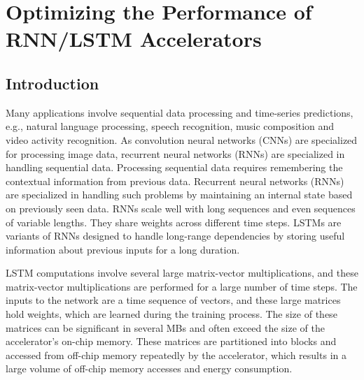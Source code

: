\graphicspath{{./Ch4-RNN/images/}}

\chapter{Optimizing the Performance of RNN/LSTM Accelerators} \label{chap:RNN}
\section{Introduction}
Many applications involve sequential data processing and time-series predictions, e.g., natural language processing, speech recognition, music composition and video activity recognition. As convolution neural networks (CNNs) are specialized for processing image data, recurrent neural networks (RNNs) are specialized in handling sequential data. Processing sequential data requires remembering the contextual information from previous data. Recurrent neural networks (RNNs) are specialized in handling such problems by maintaining an internal state based on previously seen data. RNNs scale well with long sequences and even sequences of variable lengths. They share weights across different time steps. LSTMs \cite{hochreiter1997long} are variants of RNNs designed to handle long-range dependencies by storing useful information about previous inputs for a long duration. 

LSTM computations involve several large matrix-vector multiplications, and these matrix-vector multiplications are performed for a large number of time steps. The inputs to the network are a time sequence of vectors, and these large matrices hold weights, which are learned during the training process. The size of these matrices can be significant in several MBs and often exceed the size of the accelerator's on-chip memory. These matrices are partitioned into blocks and accessed from off-chip memory repeatedly by the accelerator, which results in a large volume of off-chip memory accesses and energy consumption.

